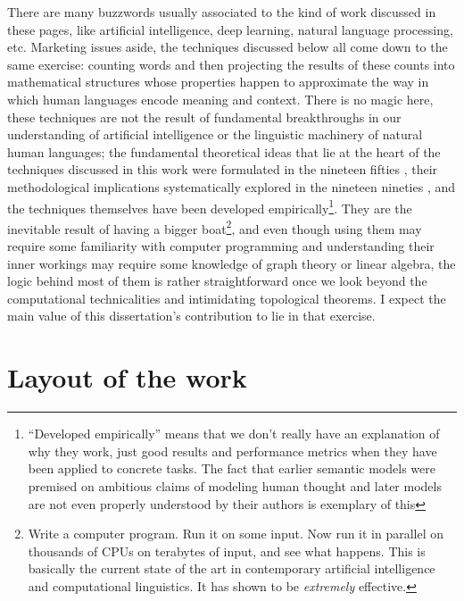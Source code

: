 There are many buzzwords usually associated to the kind of work discussed in these pages, like artificial intelligence, deep learning, natural language processing, etc.
Marketing issues aside, the techniques discussed below all come down to the same exercise: counting words and then projecting the results of these counts into mathematical structures whose properties happen to approximate the way in which human languages encode meaning and context.
There is no magic here, these techniques are not the result of fundamental breakthroughs in our understanding of artificial intelligence or the linguistic machinery of natural human languages; the fundamental theoretical ideas that lie at the heart of the techniques discussed in this work were formulated in the nineteen fifties \citep{firth1957}, their methodological implications systematically explored in the nineteen nineties \citep{harris1988,harris1991}, and the techniques themselves have been developed empirically\footnote{
    \label{foot:empir1}
    ``Developed empirically'' means that we don't really have an explanation of why they work, just good results and performance metrics when they have been applied to concrete tasks.
    The fact that earlier semantic models were premised on ambitious claims of modeling human thought \citep{landauer1997,lund1996} and later models are not even properly understood by their authors \citep{mikolov2013,levy2014} is exemplary of this
}.
They are the inevitable result of having a bigger boat\footnote{
    \label{foot:boat}
    Write a computer program. Run it on some input. Now run it in parallel on thousands of CPUs on terabytes of input, and see what happens. This is basically the current state of the art in contemporary artificial intelligence and computational linguistics. It has shown to be \emph{extremely} effective.
}, and even though using them may require some familiarity with computer programming and understanding their inner workings may require some knowledge of graph theory or linear algebra, the logic behind most of them is rather straightforward once we look beyond the computational technicalities and intimidating topological theorems.
I expect the main value of this dissertation's contribution to lie in that exercise.

\section*{Layout of the work}
\label{sec:layout}

